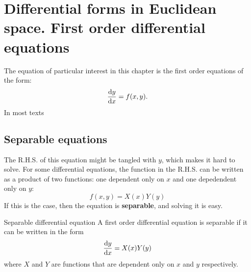 \chapter{Differential forms in Euclidean space. First order differential equations}

The equation of particular interest in this chapter is the first order equations of the form:
\begin{equation}
  \odv{y}{x} = f(x, y).
\end{equation}
In most texts

\section{Separable equations}

The R.H.S. of this equation might be tangled with \(y\), which makes it hard to solve. For some differential equations, the function in the R.H.S. can be written as a product of two functions: one dependent only on \(x\) and one depedendent only on \(y\):
\begin{equation}
  f(x, y) = X(x)Y(y)
\end{equation}
If this is the case, then the equation is \textbf{separable}, and solving it is easy.

\begin{df}{Separable differential equation}{}
  A first order differential equation is separable if it can be written in the form
  \begin{equation}
    \odv{y}{x} = X(x)Y(y)
  \end{equation}
  where \(X\) and \(Y\) are functions that are dependent only on \(x\) and \(y\) respectively.
\end{df}
